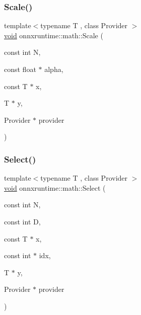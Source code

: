 \subsubsection{\texorpdfstring{Scale()}{Scale()}\hspace{0.1cm}{\footnotesize\ttfamily [2/2]}}
{\footnotesize\ttfamily template$<$typename T , class Provider $>$ \\
\mbox{\hyperlink{mlasi_8h_a88f941d423cb2a819b70a1358982b1a6}{void}} onnxruntime\+::math\+::\+Scale (\begin{DoxyParamCaption}\item[{const int}]{N,  }\item[{const float $\ast$}]{alpha,  }\item[{const T $\ast$}]{x,  }\item[{T $\ast$}]{y,  }\item[{Provider $\ast$}]{provider }\end{DoxyParamCaption})}

\mbox{\label{namespaceonnxruntime_1_1math_a942b4be2e0b3bcd1582319fa45f0121c}} 
\subsubsection{\texorpdfstring{Select()}{Select()}}
{\footnotesize\ttfamily template$<$typename T , class Provider $>$ \\
\mbox{\hyperlink{mlasi_8h_a88f941d423cb2a819b70a1358982b1a6}{void}} onnxruntime\+::math\+::\+Select (\begin{DoxyParamCaption}\item[{const int}]{N,  }\item[{const int}]{D,  }\item[{const T $\ast$}]{x,  }\item[{const int $\ast$}]{idx,  }\item[{T $\ast$}]{y,  }\item[{Provider $\ast$}]{provider }\end{DoxyParamCaption})}

\mbox{\label{namespaceonnxruntime_1_1math_a5af96dd791e9b526301eb469b35374d8}} 

